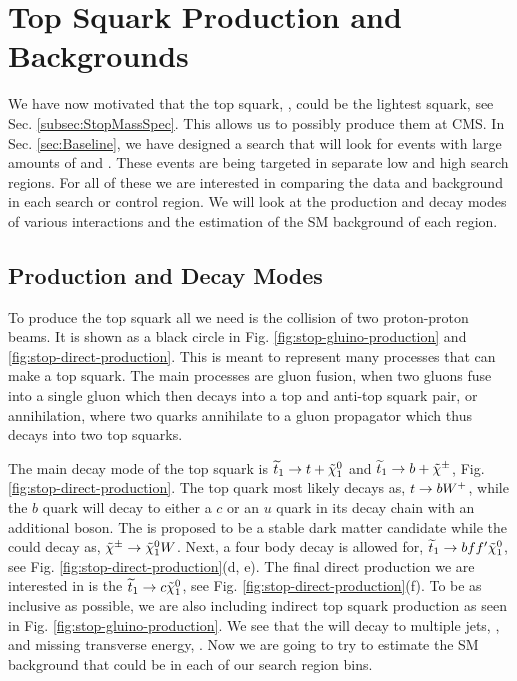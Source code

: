 \chapter{Top Squark Production and Backgrounds}
\label{ch:Search}

We have now motivated that the top squark, \st{}, could be the lightest squark, see Sec. \ref{subsec:StopMassSpec}. This allows us to possibly produce them at CMS. In Sec. \ref{sec:Baseline}, we have designed a search that will look for events with large amounts of \met{} and \nj. These events are being targeted in separate low \dm{} and high \dm{} search regions. For all of these we are interested in comparing the data and background in each search or control region. We will look at the production and decay modes of various \st{} interactions and the estimation of the SM background of each region. 

\section{Production and Decay Modes}
\label{sec:Production}

To produce the top squark all we need is the collision of two proton-proton beams. It is shown as a black circle in Fig. \ref{fig:stop-gluino-production} and \ref{fig:stop-direct-production}. This is meant to represent many processes that can make a top squark. The main processes are gluon fusion, when two gluons fuse into a single gluon which then decays into a top and anti-top squark pair, or annihilation, where two quarks annihilate to a gluon propagator which thus decays into two top squarks. 



The main decay mode of the top squark is $\widetilde{t}_1\rightarrow t+\tilde{\chi}^{0}_{1}$ and $\widetilde{t}_1\rightarrow b+\tilde{\chi}^{\pm}$, Fig. \ref{fig:stop-direct-production}. The top quark most likely decays as, $t\rightarrow bW^+$, while the $b$ quark will decay to either a $c$ or an $u$ quark in its decay chain with an additional \W{} boson. The \neutralino{} is proposed to be a stable dark matter candidate while the \chargino{} could decay as, $\tilde{\chi}^{\pm}\rightarrow\tilde{\chi}^{0}_{1}W$. Next, a four body decay is allowed for, $\widetilde{t}_1\rightarrow b f f^\prime \tilde{\chi}^{0}_{1}$, see Fig. \ref{fig:stop-direct-production}(d, e). The final direct \st{} production we are interested in is the $\widetilde{t}_1\rightarrow c\tilde{\chi}^{0}_{1}$, see Fig. \ref{fig:stop-direct-production}(f). To be as inclusive as possible, we are also including indirect top squark production as seen in Fig. \ref{fig:stop-gluino-production}. We see that the \st{} will decay to multiple jets, \nj, and missing transverse energy, \met. Now we are going to try to estimate the SM background that could be in each of our search region bins.

